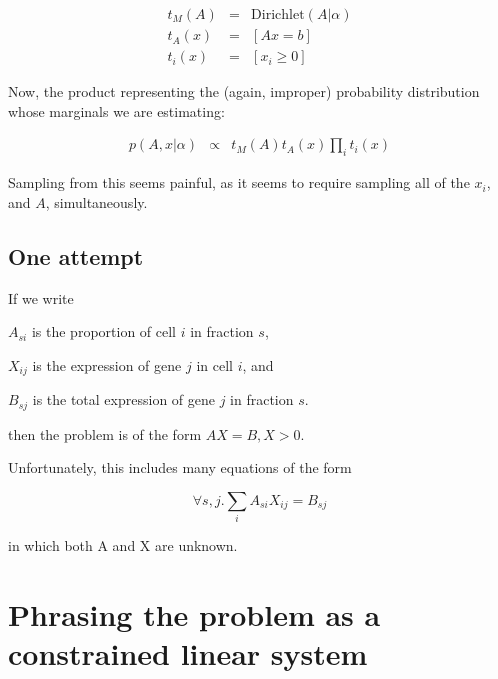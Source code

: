 \documentclass{article}
\begin{document}
\begin{eqnarray}
t_M(A) & = & \mathrm{Dirichlet}(A|\alpha) \\
t_A(x) & = & [Ax = b] \\
t_i(x) & = & [x_i \ge 0]
\end{eqnarray}

Now, the product representing the (again, improper) probability distribution
whose marginals we are estimating:

\begin{eqnarray}
p(A, x|\alpha) & \propto & t_M(A) t_A(x) \prod_i t_i(x)
\end{eqnarray}

Sampling from this seems painful, as it seems to require sampling all of
the $x_i$, and $A$, simultaneously.


\subsection{One attempt}

If we write

$A_{si}$ is the proportion of cell $i$ in fraction $s$,

$X_{ij}$ is the expression of gene $j$ in cell $i$, and

$B_{sj}$ is the total expression of gene $j$ in fraction $s$.

then the problem is of the form $AX = B, X > 0$.

Unfortunately, this includes many equations of the form

\[
\forall s, j. \sum_i A_{si} X_{ij} = B_{sj}
\]

in which both A and X are unknown.


\section{Phrasing the problem as a constrained linear system}
\end{document}
